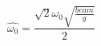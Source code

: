 \begin{equation} \label{eq:omega0_hat_equation}
\hat{\omega_{0}} = \frac{\sqrt{2} \omega_{0} \sqrt{\frac{beam}{g}}}{2}
\end{equation}
